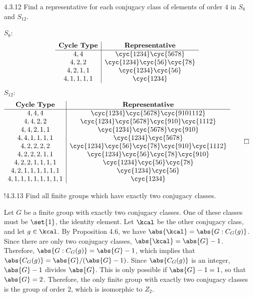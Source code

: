 \begin{exercise}{4.3.12}
	Find a representative for each conjugacy class of elements of order $4$ in $S_8$ and $S_{12}$.
\end{exercise}

\begin{sol}
	$S_8$:
	\[
		\begin{array}{c|c}
			\textbf{Cycle Type} & \textbf{Representative} \\
			\hline
			4, 4 & \cyc{1 2 3 4}\cyc{5 6 7 8} \\
			4, 2, 2 & \cyc{1 2 3 4}\cyc{5 6}\cyc{7 8} \\
			4, 2, 1, 1 & \cyc{1 2 3 4}\cyc{5 6} \\
			4, 1, 1, 1, 1 & \cyc{1 2 3 4}
		\end{array}
	\]
	$S_{12}$:
	\[
		\begin{array}{c|c}
			\textbf{Cycle Type} & \textbf{Representative} \\
			\hline
			4, 4, 4 & \cyc{1 2 3 4}\cyc{5 6 7 8}\cyc{9 10 11 12} \\
			4, 4, 2, 2 & \cyc{1 2 3 4}\cyc{5 6 7 8}\cyc{9 10}\cyc{11 12} \\
			4, 4, 2, 1, 1 & \cyc{1 2 3 4}\cyc{5 6 7 8}\cyc{9 10} \\
			4, 4, 1, 1, 1, 1 & \cyc{1 2 3 4}\cyc{5 6 7 8} \\
			4, 2, 2, 2, 2 & \cyc{1 2 3 4}\cyc{5 6}\cyc{7 8}\cyc{9 10}\cyc{11 12} \\
			4, 2, 2, 2, 1, 1 & \cyc{1 2 3 4}\cyc{5 6}\cyc{7 8}\cyc{9 10} \\
			4, 2, 2, 1, 1, 1, 1 & \cyc{1 2 3 4}\cyc{5 6}\cyc{7 8} \\
			4, 2, 1, 1, 1, 1, 1, 1 & \cyc{1 2 3 4}\cyc{5 6} \\
			4, 1, 1, 1, 1, 1, 1, 1, 1 & \cyc{1 2 3 4}
		\end{array} \qedhere
	\]
\end{sol}

\begin{exercise}!{4.3.13}
	Find all finite groups which have exactly two conjugacy classes.
\end{exercise}

\begin{sol}
	Let $G$ be a finite group with exactly two conjugacy classes.
	One of these classes must be $\set{1}$, the identity element.
	Let $\kcal$ be the other conjugacy class, and let $g \in \kcal$.
	By Proposition 4.6, we have $\abs{\kcal} = \abs{G : C_G(g)}$.
	Since there are only two conjugacy classes, $\abs{\kcal} = \abs{G} - 1$.
	Therefore, $\abs{G : C_G(g)} = \abs{G} - 1$, which implies that $\abs{C_G(g)} = \abs{G}/(\abs{G} - 1)$.
	Since $\abs{C_G(g)}$ is an integer, $\abs{G} - 1$ divides $\abs{G}$.
	This is only possible if $\abs{G} - 1 = 1$, so that $\abs{G} = 2$.
	Therefore, the only finite group with exactly two conjugacy classes is the group of order 2, which is isomorphic to $Z_2$.
\end{sol}

